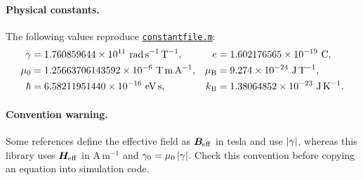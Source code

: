 \paragraph{Physical constants.}
The following values reproduce
\href{https://github.com/zhuzibn/general/blob/master/constant/constantfile.m}%
{\texttt{constantfile.m}}:
\begin{align*}
    \gamma &= 1.760859644\times10^{11}\ \mathrm{rad\,s^{-1}\,T^{-1}},
    & e &= 1.602176565\times10^{-19}\ \mathrm{C}, \\
    \mu_0 &= 1.25663706143592\times10^{-6}\ \mathrm{T\,m\,A^{-1}},
    & \muB &= 9.274\times10^{-24}\ \mathrm{J\,T^{-1}}, \\
    \hbar &= 6.58211951440\times10^{-16}\ \mathrm{eV\,s},
    & \kB &= 1.38064852\times10^{-23}\ \mathrm{J\,K^{-1}}.
\end{align*}

\paragraph{Convention warning.}
Some references define the effective field as $\bm{B}_{\mathrm{eff}}$ in tesla and
use $\left\lvert \gamma \right\rvert$, whereas this library uses $\bm{H}_{\mathrm{eff}}$ in $\mathrm{A\,m^{-1}}$ and
$\gamma_0=\mu_0\left\lvert \gamma \right\rvert$.  Check this convention before copying an equation into
simulation code.
